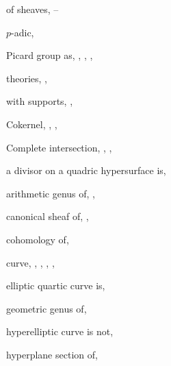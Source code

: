 {{\noindent\hspace*{7.5bp}of sheaves, --\par
\noindent\hspace*{7.5bp}$p$-adic, \par
\noindent\hspace*{7.5bp}Picard group as, , , , \par
\noindent\hspace*{7.5bp}theories, , \par
\noindent\hspace*{7.5bp}with supports, , \par
\noindent\hspace*{0.0bp}Cokernel, , , \par
\noindent\hspace*{0.0bp}Complete intersection, , , \par
\noindent\hspace*{7.5bp}a divisor on a quadric hypersurface is,\par
\noindent\hspace*{15.0bp}\par
\noindent\hspace*{7.5bp}arithmetic genus of, , \par
\noindent\hspace*{7.5bp}canonical sheaf of, , \par
\noindent\hspace*{7.5bp}cohomology of, \par
\noindent\hspace*{7.5bp}curve, , , , , \par
\noindent\hspace*{7.5bp}elliptic quartic curve is, \par
\noindent\hspace*{7.5bp}geometric genus of, \par
\noindent\hspace*{7.5bp}hyperelliptic curve is not, \par
\noindent\hspace*{7.5bp}hyperplane section of, \par
}}
